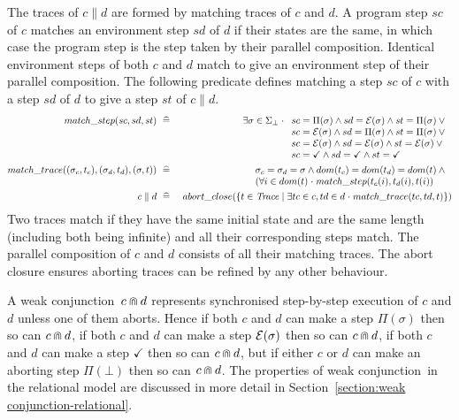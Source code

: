 \documentclass[fleqn]{fac}
\newcommand{\sdefs}{\mathrel{\widehat=}}\newcommand{\spot}{\mathrel{{\cdot}}}\newcommand{\where}{\mathrel{|}}\renewcommand{\implies}{\mathrel{\Rightarrow}}\newcommand{\emptyrel}{\emptyset}
\newcommand{\strictconjunction}{weak conjunction}
\newcommand{\together}{\mathbin{\doublecap}}
\newcommand{\Trace}{\mathit{Trace}}
\newcommand{\botstate}{\bot}
\newcommand{\pstepl}[1]{\Pi(#1)}
\newcommand{\estepl}[1]{{\cal E}(#1)}
\newcommand{\termd}{\checkmark}
\begin{document}
The traces of $c \parallel d$ are formed by matching traces of $c$ and $d$.
A program step $sc$ of $c$ matches an environment step $sd$ of $d$ 
if their states are the same,
in which case the program step is the step taken by their parallel composition.
Identical environment steps of both $c$ and $d$ match
to give an environment step of their parallel composition.
The following predicate defines matching a step $sc$ of $c$ 
with a step $sd$ of $d$ to give a step $st$ of $c \parallel d$.
\begin{eqnarray*}
  match\_step(sc,sd,st) & ~\sdefs~ & \exists \sigma \in \Sigma_{\botstate} \spot \begin{array}[t]{l}
           sc = \pstepl{\sigma} \land sd = \estepl{\sigma} \land st = \pstepl{\sigma} \lor {} \\
           sc = \estepl{\sigma} \land sd = \pstepl{\sigma} \land st = \pstepl{\sigma} \lor {} \\
           sc = \estepl{\sigma} \land sd = \estepl{\sigma} \land st = \estepl{\sigma} \lor {} \\
           sc = \termd \land sd = \termd \land st = \termd
       \end{array} \\
  match\_trace((\sigma_c,t_c),(\sigma_d,t_d),(\sigma,t)) & ~\sdefs~ & 
       \begin{array}[t]{l}
           \sigma_c = \sigma_d = \sigma \land dom(t_c) = dom(t_d) = dom(t) \land {} \\
           (\forall i \in dom(t) \spot match\_step(t_c(i),t_d(i),t(i))
        \end{array} \\
  c \parallel d & ~\sdefs~ & abort\_close(\{ t \in \Trace \where \exists tc \in c, td \in d \spot match\_trace(tc,td,t) \})
\end{eqnarray*}
Two traces match if they have the same initial state and are the same length 
(including both being infinite) and
all their corresponding steps match.
The parallel composition of $c$ and $d$ consists of all their matching traces.
The abort closure ensures aborting traces can be refined by any other behaviour.


A \strictconjunction\ $c \together d$ represents synchronised step-by-step execution of $c$ and $d$
unless one of them aborts.
Hence 
if both $c$ and $d$ can make a step $\pstepl{\sigma}$ then so can $c \together d$,
if both $c$ and $d$ can make a step $\estepl{\sigma}$ then so can $c \together d$,
if both $c$ and $d$ can make a step $\termd$ then so can $c \together d$,
but 
if either $c$ or $d$ can make an aborting step $\pstepl{\botstate}$ then so can $c \together d$.
The properties of \strictconjunction\ in the relational model are discussed in more detail 
in Section~\ref{section:\strictconjunction-relational}.
\end{document}
